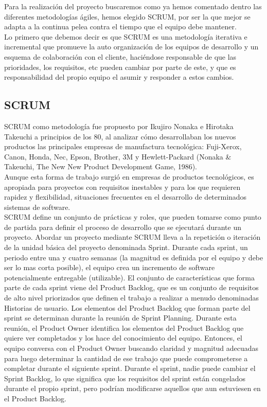 \documentclass[../pfc.tex]{subfiles}
\begin{document}
	Para la realización del proyecto buscaremos como ya hemos comentado dentro las diferentes metodologías ágiles, hemos elegido SCRUM, por ser la que mejor se adapta a la continua pelea contra el tiempo que el equipo debe mantener. \\
	Lo primero que debemos decir es que SCRUM es una metodología iterativa e incremental que promueve la auto organización de los equipos de desarrollo y un esquema de colaboración con el cliente, haciéndose responsable de que las prioridades, los requisitos, etc pueden cambiar por parte de este, y que es responsabilidad del propio equipo el asumir y responder a estos cambios. 
	
	\subsection{SCRUM}
	
	SCRUM como metodología fue propuesto por Ikujiro Nonaka e Hirotaka Takeuchi a principios de los 80, al analizar cómo desarrollaban los nuevos productos las principales empresas de manufactura tecnológica: Fuji-Xerox, Canon, Honda, Nec, Epson, Brother, 3M y Hewlett-Packard (Nonaka \& Takeuchi, The New New Product Development Game, 1986).\\
	Aunque esta forma de trabajo surgió en empresas de productos tecnológicos, es apropiada para proyectos con requisitos inestables y para los que requieren rapidez y flexibilidad, situaciones frecuentes en el desarrollo de determinados sistemas de software.\\
	
	SCRUM define un conjunto de prácticas y roles, que pueden tomarse como punto de partida para definir el proceso de desarrollo que se ejecutará durante un proyecto. Abordar un proyecto mediante SCRUM lleva a la repetición o iteración de la unidad básica del proyecto denominada Sprint. Durante cada sprint, un periodo entre una y cuatro semanas (la magnitud es definida por el equipo y debe ser lo mas corta posible), el equipo crea un incremento de software potencialmente entregable (utilizable). El conjunto de características que forma parte de cada sprint viene del Product Backlog, que es un conjunto de requisitos de alto nivel priorizados que definen el trabajo a realizar a menudo denominadas Historias de usuario. Los elementos del Product Backlog que forman parte del sprint se determinan durante la reunión de Sprint Planning. Durante esta reunión, el Product Owner identifica los elementos del Product Backlog que quiere ver completados y los hace del conocimiento del equipo. Entonces, el equipo conversa con el Product Owner buscando claridad y magnitud adecuadas para luego determinar la cantidad de ese trabajo que puede comprometerse a completar durante el siguiente sprint. Durante el sprint, nadie puede cambiar el Sprint Backlog, lo que significa que los requisitos del sprint están congelados durante el propio sprint, pero podrían modificarse aquellos que aun estuviesen en el Product Backlog.\\
	
\end{document}
